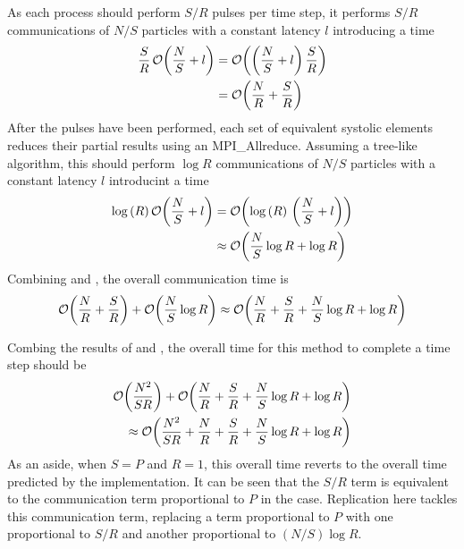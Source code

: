 %
As each process should perform $S/R$ pulses per time step, it performs
$S/R$ communications of $N/S$ particles with a constant latency $l$
introducing a time
\begin{equation}
    \label{eqn:replicated_systolic_pair_operation_pulse_time}
    \begin{split}
        \frac{S}{R}\,\mathcal{O}{\left({ \frac{N}{S} + l }\right)}
            &= \mathcal{O}{\left({ \left(\frac{N}{S} + l\right)\frac{S}{R} }\right)} \\
            &= \mathcal{O}{\left({ \frac{N}{R} + \frac{S}{R} }\right)}
    \end{split}
\end{equation}
%
After the pulses have been performed, each set of equivalent systolic
elements reduces their partial results using an MPI\_Allreduce.
%
Assuming a tree-like algorithm, this should perform $\log{R}$ communications
of $N/S$ particles with a constant latency $l$ introducint a time
\begin{equation}
    \label{eqn:replicated_systolic_pair_operation_reduce_time}
    \begin{split}
        \log{(R)}\,\mathcal{O}{\left({ \frac{N}{S} + l }\right)}
            &= \mathcal{O}{\left({ \log{(R)}\, \left(\frac{N}{S} + l\right) }\right)} \\
            &\approx{} \mathcal{O}{\left({ \frac{N}{S}\log{R} + \log{R} }\right)}
    \end{split}
\end{equation}
%
Combining
 and
,
the overall communication time is
\begin{equation}
    \label{eqn:replicated_systolic_pair_operation_communication_time}
    \mathcal{O}{\left({ \frac{N}{R} + \frac{S}{R} }\right)} + \mathcal{O}{\left({ \frac{N}{S}\log{R} }\right)}
        \approx{}
        \mathcal{O}{\left({ \frac{N}{R} + \frac{S}{R} + \frac{N}{S}\log{R} + \log{R} }\right)}
\end{equation}

%
Combing the results of 
 and
,
the overall time for this method to complete a time step should be
\begin{equation}
    \label{eqn:replicated_systolic_pair_operation_overall_time}
    \begin{split}
    \mathcal{O}{\left({ \frac{N^2}{SR} }\right)}
        + \mathcal{O}{\left({ \frac{N}{R} + \frac{S}{R} + \frac{N}{S}\log{R} + \log{R} }\right)} \\
        \approx{} \mathcal{O}{\left({ \frac{N^2}{SR}
        + \frac{N}{R} + \frac{S}{R} + \frac{N}{S}\log{R} + \log{R} }\right)}
    \end{split}
\end{equation}
%
As an aside, when $S = P$ and $R = 1$, this overall time reverts
to the overall time predicted by the \systolicloop{} implementation.
%
It can be seen that the $S/R$ term is equivalent to the communication
term proportional to $P$ in the \systolicloop{} case.
%
Replication here tackles this communication term, replacing a term
proportional to $P$ with one proportional to $S/R$ and another
proportional to $(N/S)\log{R}$.



